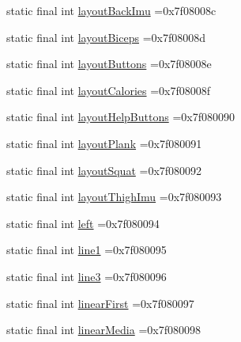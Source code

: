 \begin{DoxyCompactItemize}
\item 
static final int \mbox{\hyperlink{classcom_1_1example_1_1trainawearapplication_1_1_r_1_1id_a9fa3b9853883eb1908d91ad103f9d7f9}{layout\+Back\+Imu}} =0x7f08008c
\item 
static final int \mbox{\hyperlink{classcom_1_1example_1_1trainawearapplication_1_1_r_1_1id_afedeccbb846e0bb5d65306d266de0485}{layout\+Biceps}} =0x7f08008d
\item 
static final int \mbox{\hyperlink{classcom_1_1example_1_1trainawearapplication_1_1_r_1_1id_aa4f3174e641207271206d59a91f4e521}{layout\+Buttons}} =0x7f08008e
\item 
static final int \mbox{\hyperlink{classcom_1_1example_1_1trainawearapplication_1_1_r_1_1id_a8f4391cd3e99c700cd6ed9d1e2a7e5b0}{layout\+Calories}} =0x7f08008f
\item 
static final int \mbox{\hyperlink{classcom_1_1example_1_1trainawearapplication_1_1_r_1_1id_a39f738420776cab8313ff1c27c24d52d}{layout\+Help\+Buttons}} =0x7f080090
\item 
static final int \mbox{\hyperlink{classcom_1_1example_1_1trainawearapplication_1_1_r_1_1id_a5fed3c926754ecb0f3ed9bd179769da9}{layout\+Plank}} =0x7f080091
\item 
static final int \mbox{\hyperlink{classcom_1_1example_1_1trainawearapplication_1_1_r_1_1id_a72b689be4ad308f15520352614a30cef}{layout\+Squat}} =0x7f080092
\item 
static final int \mbox{\hyperlink{classcom_1_1example_1_1trainawearapplication_1_1_r_1_1id_a544755c476e41947e50a39d95f9174dd}{layout\+Thigh\+Imu}} =0x7f080093
\item 
static final int \mbox{\hyperlink{classcom_1_1example_1_1trainawearapplication_1_1_r_1_1id_a2cba0c6d0d6c6c478a414b99c9a9abc9}{left}} =0x7f080094
\item 
static final int \mbox{\hyperlink{classcom_1_1example_1_1trainawearapplication_1_1_r_1_1id_a8bbbb8b5e383285c844d9f0229d3a027}{line1}} =0x7f080095
\item 
static final int \mbox{\hyperlink{classcom_1_1example_1_1trainawearapplication_1_1_r_1_1id_a8d7042b2daa6b07138799e0d1740eb9d}{line3}} =0x7f080096
\item 
static final int \mbox{\hyperlink{classcom_1_1example_1_1trainawearapplication_1_1_r_1_1id_a84498cb3ddfd415666c4added32ff614}{linear\+First}} =0x7f080097
\item 
static final int \mbox{\hyperlink{classcom_1_1example_1_1trainawearapplication_1_1_r_1_1id_a479b6b4e85779cfc8b7f5c9b7e6507d3}{linear\+Media}} =0x7f080098

\end{DoxyCompactItemize}
